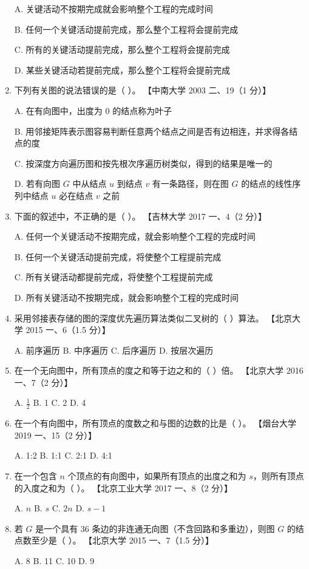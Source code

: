 \documentclass[lang=cn,newtx,10pt,scheme=chinese]{elegantbook}
\begin{document}
\begin{enumerate}
    A. 关键活动不按期完成就会影响整个工程的完成时间  

    B. 任何一个关键活动提前完成，那么整个工程将会提前完成  

    C. 所有的关键活动提前完成，那么整个工程将会提前完成  

    D. 某些关键活动若提前完成，那么整个工程将会提前完成  

    \item 下列有关图的说法错误的是（ ）。  
    【中南大学 2003 二、19（1 分）】  

    A. 在有向图中，出度为 0 的结点称为叶子  

    B. 用邻接矩阵表示图容易判断任意两个结点之间是否有边相连，并求得各结点的度  

    C. 按深度方向遍历图和按先根次序遍历树类似，得到的结果是唯一的  

    D. 若有向图 $G$ 中从结点 $u$ 到结点 $v$ 有一条路径，则在图 $G$ 的结点的线性序列中结点 $u$ 必在结点 $v$ 之前  

    \item 下面的叙述中，不正确的是（ ）。  
    【吉林大学 2017 一、4（2 分）】  

    A. 任何一个关键活动不按期完成，就会影响整个工程的完成时间  

    B. 任何一个关键活动提前完成，将使整个工程提前完成  

    C. 所有关键活动都提前完成，将使整个工程提前完成  

    D. 所有关键活动不按期完成，就会影响整个工程的完成时间  

    \item 采用邻接表存储的图的深度优先遍历算法类似二叉树的（ ）算法。  
    【北京大学 2015 一、6（1.5 分）】  

    A. 前序遍历 \quad B. 中序遍历 \quad C. 后序遍历 \quad D. 按层次遍历  

    \item 在一个无向图中，所有顶点的度之和等于边之和的（ ）倍。  
    【北京大学 2016 一、7（2 分）】  

    A. $\frac{1}{2}$ \quad B. 1 \quad C. 2 \quad D. 4  

    \item 在一个有向图中，所有顶点的度数之和与图的边数的比是（ ）。  
    【烟台大学 2019 一、15（2 分）】  

    A. 1:2 \quad B. 1:1 \quad C. 2:1 \quad D. 4:1  

    \item 在一个包含 $n$ 个顶点的有向图中，如果所有顶点的出度之和为 $s$，则所有顶点的入度之和为（ ）。  
    【北京工业大学 2017 一、8（2 分）】  

    A. $n$ \quad B. $s$ \quad C. $2n$ \quad D. $s-1$  

    \item 若 $G$ 是一个具有 36 条边的非连通无向图（不含回路和多重边），则图 $G$ 的结点数至少是（ ）。  
    【北京大学 2015 一、7（1.5 分）】 

    A. 8 \quad B. 11 \quad C. 10 \quad D. 9  
\end{enumerate}
\end{document}
